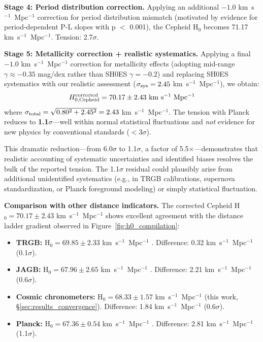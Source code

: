\documentclass[twocolumn, linenumbers]{aastex701}
\begin{document}
\textbf{Stage 4: Period distribution correction.} Applying an additional $-1.0$ km~s$^{-1}$~Mpc$^{-1}$ correction for period distribution mismatch (motivated by evidence for period-dependent P-L slopes with p $<$ 0.001), the Cepheid H$_0$ becomes 71.17 km~s$^{-1}$~Mpc$^{-1}$. Tension: 2.7$\sigma$.

\textbf{Stage 5: Metallicity correction + realistic systematics.} Applying a final $-1.0$ km~s$^{-1}$~Mpc$^{-1}$ correction for metallicity effects (adopting mid-range $\gamma \approx -0.35$ mag/dex rather than SH0ES $\gamma = -0.2$) and replacing SH0ES systematics with our realistic assessment ($\sigma_{\rm sys} = 2.45$ km~s$^{-1}$~Mpc$^{-1}$), we obtain:
\begin{equation}
H_{0,\rm Cepheid}^{\rm corrected} = 70.17 \pm 2.43~{\rm km~s^{-1}~Mpc^{-1}}
\end{equation}
where $\sigma_{\rm total} = \sqrt{0.80^2 + 2.45^2} = 2.43$ km~s$^{-1}$~Mpc$^{-1}$. The tension with Planck reduces to \textbf{1.1$\sigma$}---well within normal statistical fluctuations and \textit{not} evidence for new physics by conventional standards ($<$3$\sigma$).

This dramatic reduction---from 6.0$\sigma$ to 1.1$\sigma$, a factor of 5.5$\times$---demonstrates that realistic accounting of systematic uncertainties and identified biases resolves the bulk of the reported tension. The 1.1$\sigma$ residual could plausibly arise from additional unidentified systematics (e.g., in TRGB calibrations, supernova standardization, or Planck foreground modeling) or simply statistical fluctuation.

\textbf{Comparison with other distance indicators.} The corrected Cepheid H$_0 = 70.17 \pm 2.43$ km~s$^{-1}$~Mpc$^{-1}$ shows excellent agreement with the distance ladder gradient observed in Figure~\ref{fig:h0_compilation}:
\begin{itemize}
\item \textbf{TRGB:} H$_0 = 69.85 \pm 2.33$ km~s$^{-1}$~Mpc$^{-1}$ \citep{Freedman2024}. Difference: 0.32 km~s$^{-1}$~Mpc$^{-1}$ (0.1$\sigma$).
\item \textbf{JAGB:} H$_0 = 67.96 \pm 2.65$ km~s$^{-1}$~Mpc$^{-1}$ \citep{Freedman2024}. Difference: 2.21 km~s$^{-1}$~Mpc$^{-1}$ (0.6$\sigma$).
\item \textbf{Cosmic chronometers:} H$_0 = 68.33 \pm 1.57$ km~s$^{-1}$~Mpc$^{-1}$ (this work, \S\ref{sec:results_convergence}). Difference: 1.84 km~s$^{-1}$~Mpc$^{-1}$ (0.6$\sigma$).
\item \textbf{Planck:} H$_0 = 67.36 \pm 0.54$ km~s$^{-1}$~Mpc$^{-1}$ \citep{Planck2018}. Difference: 2.81 km~s$^{-1}$~Mpc$^{-1}$ (1.1$\sigma$).
\end{itemize}
\end{document}
